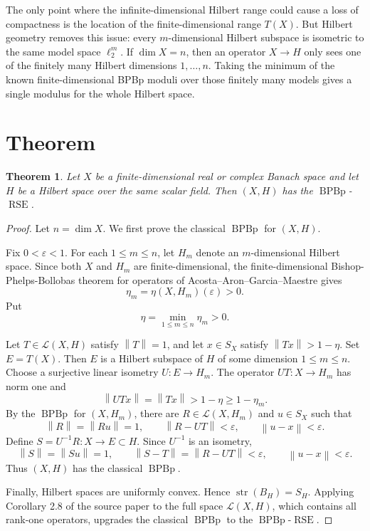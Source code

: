 \documentclass[11pt]{article}
\newtheorem{theorem}{Theorem}
\newcommand{\BPBp}{\operatorname{BPBp}}
\newcommand{\RSE}{\operatorname{RSE}}
\newcommand{\str}{\operatorname{str}}
\newcommand{\norm}[1]{\left\lVert #1 \right\rVert}
\begin{document}
The only point where the infinite-dimensional Hilbert range could cause a
loss of compactness is the location of the finite-dimensional range
\(T(X)\).  But Hilbert geometry removes this issue: every \(m\)-dimensional
Hilbert subspace is isometric to the same model space \(\ell_2^m\).  If
\(\dim X=n\), then an operator \(X\to H\) only sees one of the finitely many
Hilbert dimensions \(1,\ldots,n\).  Taking the minimum of the known
finite-dimensional BPBp moduli over those finitely many models gives a
single modulus for the whole Hilbert space.

\section*{Theorem}

\begin{theorem}
Let \(X\) be a finite-dimensional real or complex Banach space and let \(H\)
be a Hilbert space over the same scalar field.  Then \((X,H)\) has the
\(\BPBp\)-\(\RSE\).
\end{theorem}

\begin{proof}
Let \(n=\dim X\).  We first prove the classical \(\BPBp\) for \((X,H)\).

Fix \(0<\varepsilon<1\).  For each \(1\leq m\leq n\), let \(H_m\) denote an
\(m\)-dimensional Hilbert space.  Since both \(X\) and \(H_m\) are
finite-dimensional, the finite-dimensional Bishop-Phelps-Bollobas theorem
for operators of Acosta--Aron--Garcia--Maestre gives
\[
  \eta_m=\eta(X,H_m)(\varepsilon)>0 .
\]
Put
\[
  \eta=\min_{1\leq m\leq n}\eta_m>0 .
\]

Let \(T\in \mathcal L(X,H)\) satisfy \(\norm{T}=1\), and let \(x\in S_X\)
satisfy \(\norm{Tx}>1-\eta\).  Set \(E=T(X)\).  Then \(E\) is a Hilbert
subspace of \(H\) of some dimension \(1\leq m\leq n\).  Choose a surjective
linear isometry \(U:E\to H_m\).  The operator \(UT:X\to H_m\) has norm one
and
\[
  \norm{UTx}=\norm{Tx}>1-\eta\geq 1-\eta_m .
\]
By the \(\BPBp\) for \((X,H_m)\), there are \(R\in\mathcal L(X,H_m)\) and
\(u\in S_X\) such that
\[
  \norm{R}=\norm{Ru}=1,\qquad
  \norm{R-UT}<\varepsilon,\qquad
  \norm{u-x}<\varepsilon .
\]
Define \(S=U^{-1}R:X\to E\subset H\).  Since \(U^{-1}\) is an isometry,
\[
  \norm{S}=\norm{Su}=1,\qquad
  \norm{S-T}=\norm{R-UT}<\varepsilon,\qquad
  \norm{u-x}<\varepsilon .
\]
Thus \((X,H)\) has the classical \(\BPBp\).

Finally, Hilbert spaces are uniformly convex.  Hence \(\str(B_H)=S_H\).
Applying Corollary 2.8 of the source paper to the full space
\(\mathcal L(X,H)\), which contains all rank-one operators, upgrades the
classical \(\BPBp\) to the \(\BPBp\)-\(\RSE\).
\end{proof}
\end{document}

